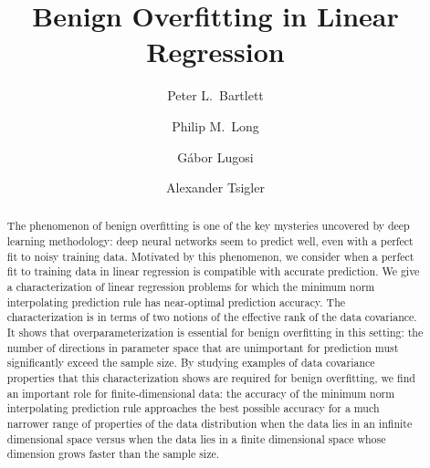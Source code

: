 \documentclass[11pt,notitlepage]{article}
\begin{document}
\title{Benign Overfitting in Linear Regression}
\date{}

\author[a,b]{Peter L.~Bartlett}
\author[c]{Philip M.~Long}
\author[d]{G\'abor Lugosi}
\author[a]{Alexander Tsigler}




\maketitle

\begin{abstract}
The phenomenon of benign overfitting is one of the key
mysteries uncovered by deep learning methodology: deep
neural networks seem to predict well, even with a perfect
fit to noisy training data. Motivated by this phenomenon,
we consider when a perfect fit to training data in
linear regression is compatible with accurate prediction.
We give a characterization of linear regression
problems for which the minimum norm interpolating prediction rule
has near-optimal prediction accuracy. The characterization is in
terms of two notions of the effective rank of the data covariance.
It shows that overparameterization is essential for
benign overfitting in this setting: the number of directions
in parameter space 
that are unimportant for prediction must
significantly exceed the sample size.  By studying examples of data
covariance properties that this characterization shows are required
for benign overfitting, we find an important role for
finite-dimensional data: the accuracy of the minimum norm
interpolating prediction rule approaches the best possible accuracy
for a much narrower range of properties of the data distribution
when the data lies in an infinite dimensional space versus when the
data lies in a finite dimensional space whose dimension grows faster
than the sample size.
\end{abstract}
\end{document}
